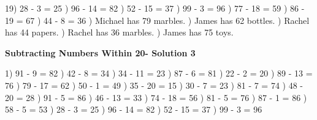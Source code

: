 \documentclass{article}%
\begin{document}
19) 28 {-} 3 = 25%
) 96 {-} 14 = 82%
) 52 {-} 15 = 37%
) 99 {-} 3 = 96%
) 77 {-} 18 = 59%
) 86 {-} 19 = 67%
) 44 {-} 8 = 36%
) Michael has 79 marbles.%
) James has 62 bottles.%
) Rachel has 44 papers.%
) Rachel has 36 marbles.%
) James has 75 toys.%
\newline%
\newpage%
\large%
\begin{center}%
\textbf{Subtracting Numbers Within 20- Solution 3}%
\newline%
\end{center} \normalsize%
1) 91 {-} 9 = 82%
) 42 {-} 8 = 34%
) 34 {-} 11 = 23%
) 87 {-} 6 = 81%
) 22 {-} 2 = 20%
) 89 {-} 13 = 76%
) 79 {-} 17 = 62%
) 50 {-} 1 = 49%
) 35 {-} 20 = 15%
) 30 {-} 7 = 23%
) 81 {-} 7 = 74%
) 48 {-} 20 = 28%
) 91 {-} 5 = 86%
) 46 {-} 13 = 33%
) 74 {-} 18 = 56%
) 81 {-} 5 = 76%
) 87 {-} 1 = 86%
) 58 {-} 5 = 53%
) 28 {-} 3 = 25%
) 96 {-} 14 = 82%
) 52 {-} 15 = 37%
) 99 {-} 3 = 96%
\newline%
\end{document}
